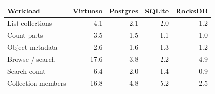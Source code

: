 \begin{tabular}{@{}lrrrr@{}}
\toprule
Workload & Virtuoso & Postgres & SQLite & RocksDB \\
\midrule
List collections & 4.1 & 2.1 & 2.0 & 1.2 \\
Count parts & 3.5 & 1.5 & 1.1 & 1.0 \\
Object metadata & 2.6 & 1.6 & 1.3 & 1.2 \\
Browse / search & 17.6 & 3.8 & 2.2 & 4.9 \\
Search count & 6.4 & 2.0 & 1.4 & 0.9 \\
Collection members & 16.8 & 4.8 & 5.2 & 2.5 \\
\bottomrule
\end{tabular}
